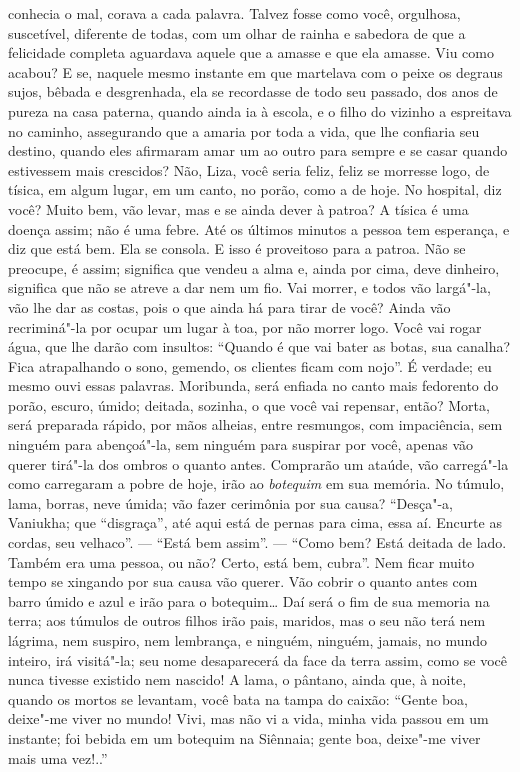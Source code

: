 conhecia o mal, corava a cada palavra. Talvez fosse como você,
orgulhosa, suscetível, diferente de todas, com um olhar de rainha e
sabedora de que a felicidade completa aguardava aquele que a amasse e
que ela amasse. Viu como acabou? E se, naquele mesmo instante em que
martelava com o peixe os degraus sujos, bêbada e desgrenhada, ela se
recordasse de todo seu passado, dos anos de pureza na casa paterna,
quando ainda ia à escola, e o filho do vizinho a espreitava no caminho,
assegurando que a amaria por toda a vida, que lhe confiaria seu destino,
quando eles afirmaram amar um ao outro para sempre e se casar quando
estivessem mais crescidos? Não, Liza, você seria feliz, feliz se
morresse logo, de tísica, em algum lugar, em um canto, no porão, como a
de hoje. No hospital, diz você? Muito bem, vão levar, mas e se ainda
dever à patroa? A tísica é uma doença assim; não é uma febre. Até os
últimos minutos a pessoa tem esperança, e diz que está bem. Ela se
consola. E isso é proveitoso para a patroa. Não se preocupe, é assim;
significa que vendeu a alma e, ainda por cima, deve dinheiro, significa
que não se atreve a dar nem um fio. Vai morrer, e todos vão largá"-la,
vão lhe dar as costas, pois o que ainda há para tirar de você? Ainda vão
recriminá"-la por ocupar um lugar à toa, por não morrer logo. Você vai
rogar água, que lhe darão com insultos: ``Quando é que vai bater as
botas, sua canalha? Fica atrapalhando o sono, gemendo, os clientes ficam
com nojo''. É verdade; eu mesmo ouvi essas palavras. Moribunda, será
enfiada no canto mais fedorento do porão, escuro, úmido; deitada,
sozinha, o que você vai repensar, então? Morta, será preparada rápido,
por mãos alheias, entre resmungos, com impaciência, sem ninguém para
abençoá"-la, sem ninguém para suspirar por você, apenas vão querer
tirá"-la dos ombros o quanto antes. Comprarão um ataúde, vão carregá"-la
como carregaram a pobre de hoje, irão ao \emph{botequim} em sua memória.
No túmulo, lama, borras, neve úmida; vão fazer cerimônia por sua causa?
``Desça"-a, Vaniukha; que ``disgraça'', até aqui está de pernas para
cima, essa aí. Encurte as cordas, seu velhaco''. --- ``Está bem assim''. ---
``Como bem? Está deitada de lado. Também era uma pessoa, ou não? Certo,
está bem, cubra''. Nem ficar muito tempo se xingando por sua causa vão
querer. Vão cobrir o quanto antes com barro úmido e azul e irão para o
botequim\ldots{} Daí será o fim de sua memoria na terra; aos túmulos de
outros filhos irão pais, maridos, mas o seu não terá nem lágrima, nem
suspiro, nem lembrança, e ninguém, ninguém, jamais, no mundo inteiro,
irá visitá"-la; seu nome desaparecerá da face da terra assim, como se
você nunca tivesse existido nem nascido! A lama, o pântano, ainda que, à
noite, quando os mortos se levantam, você bata na tampa do caixão:
``Gente boa, deixe"-me viver no mundo! Vivi, mas não vi a vida, minha
vida passou em um instante; foi bebida em um botequim na Siênnaia; gente
boa, deixe"-me viver mais uma vez!..''

